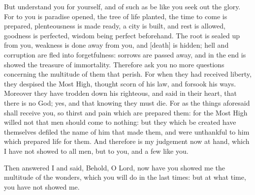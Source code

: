 {But understand you for yourself, and of such as be like you seek out the glory.
For to you is paradise opened, the tree of life planted, the time to come is prepared, plenteousness is made ready, a city is built, and rest is
 allowed, goodness is perfected, wisdom being perfect beforehand.
The root
{} is sealed up from you, weakness is done away from you, and
 [death] is hidden; hell and corruption are fled into forgetfulness:
sorrows are passed away, and in the end is showed the treasure of immortality.
Therefore ask you no more questions concerning the multitude of them that perish.
For when they had received liberty, they despised the Most High, thought scorn of his law, and forsook his ways.
Moreover they have trodden down his righteous,
and said in their heart, that there is no God; yes, and that knowing they must die.
For as the things aforesaid shall receive you, so thirst and pain which are prepared
{} them: for the Most High willed not that men should come to nothing:
but they which be created have themselves defiled the name of him that made them, and were unthankful to him which prepared life for them.
And therefore is my judgement now at hand,
which I have not showed to all men, but to you, and a few like you.
\par }{\PP Then answered I and said,
Behold, O Lord, now have you showed me the multitude of the wonders, which you will do in the last times: but at what time, you have not showed me.

}
